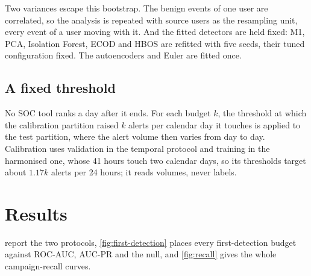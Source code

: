 \documentclass[11pt,a4paper]{article}
\begin{document}
Two variances escape this bootstrap. The benign events of one user are correlated, so the analysis is repeated with source users as the resampling unit, every event of a user moving with it. And the fitted detectors are held fixed: M1, PCA, Isolation Forest, ECOD and HBOS are refitted with five seeds, their tuned configuration fixed. The autoencoders and Euler are fitted once.

\subsection{A fixed threshold}
\label{sec:fixed}
No SOC tool ranks a day after it ends. For each budget $k$, the threshold at which the calibration partition raised $k$ alerts per calendar day it touches is applied to the test partition, where the alert volume then varies from day to day. Calibration uses validation in the temporal protocol and training in the harmonised one, whose 41 hours touch two calendar days, so its thresholds target about $1.17k$ alerts per 24 hours; it reads volumes, never labels.

\section{Results}
\label{sec:results}

 report the two protocols, \cref{fig:first-detection} places every first-detection budget against ROC-AUC, AUC-PR and the null, and \cref{fig:recall} gives the whole campaign-recall curves.
\end{document}
